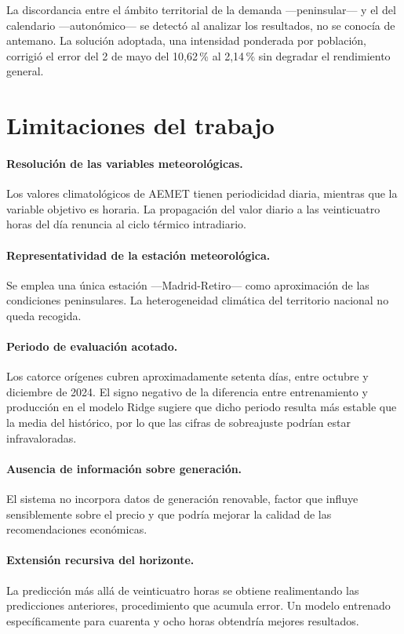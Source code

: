 La discordancia entre el ámbito territorial de la demanda —peninsular— y el del
calendario —autonómico— se detectó al analizar los resultados, no se conocía de
antemano. La solución adoptada, una intensidad ponderada por población, corrigió
el error del 2 de mayo del 10,62\,\% al 2,14\,\% sin degradar el rendimiento
general.


\section{Limitaciones del trabajo}

\paragraph{Resolución de las variables meteorológicas.}
Los valores climatológicos de AEMET tienen periodicidad diaria, mientras que la
variable objetivo es horaria. La propagación del valor diario a las veinticuatro
horas del día renuncia al ciclo térmico intradiario.

\paragraph{Representatividad de la estación meteorológica.}
Se emplea una única estación —Madrid-Retiro— como aproximación de las condiciones
peninsulares. La heterogeneidad climática del territorio nacional no queda
recogida.

\paragraph{Periodo de evaluación acotado.}
Los catorce orígenes cubren aproximadamente setenta días, entre octubre y
diciembre de 2024. El signo negativo de la diferencia entre entrenamiento y
producción en el modelo Ridge sugiere que dicho periodo resulta más estable que la
media del histórico, por lo que las cifras de sobreajuste podrían estar
infravaloradas.

\paragraph{Ausencia de información sobre generación.}
El sistema no incorpora datos de generación renovable, factor que influye
sensiblemente sobre el precio y que podría mejorar la calidad de las
recomendaciones económicas.

\paragraph{Extensión recursiva del horizonte.}
La predicción más allá de veinticuatro horas se obtiene realimentando las
predicciones anteriores, procedimiento que acumula error. Un modelo entrenado
específicamente para cuarenta y ocho horas obtendría mejores resultados.

